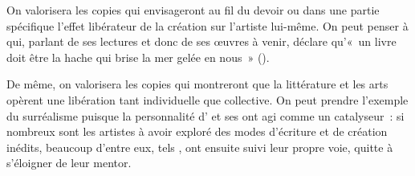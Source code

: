 {On valorisera les copies qui envisageront au fil du devoir ou dans une partie
spécifique l'effet libérateur de la création sur l'artiste lui-même. On peut penser à 
qui, parlant de ses lectures et donc de ses œuvres à venir, déclare qu'«~un livre doit
être la hache qui brise la mer gelée en nous~» ().

De même, on valorisera les copies qui montreront que la littérature et les arts
opèrent une libération tant individuelle que collective. On peut prendre l'exemple du
surréalisme puisque la personnalité d' et ses  ont agi comme un
catalyseur~: si nombreux sont les artistes à avoir exploré des modes d'écriture et de
création inédits, beaucoup d'entre eux, tels , ont ensuite suivi leur
propre voie, quitte à s'éloigner de leur mentor.
}%
